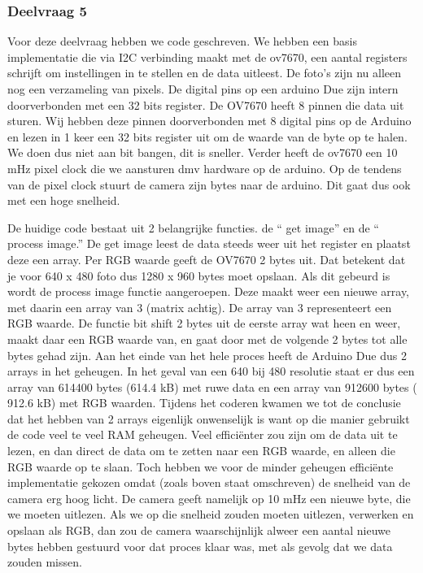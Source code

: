 \documentclass{article}
\begin{document}
\subsubsection{Deelvraag 5}
Voor deze deelvraag hebben we code geschreven. We hebben een basis implementatie die via I2C verbinding maakt met de ov7670, een aantal registers schrijft om instellingen in te stellen en de data uitleest. De foto’s zijn nu alleen nog een verzameling van pixels. De digital pins op een arduino Due zijn intern doorverbonden met een 32 bits register. De OV7670 heeft 8 pinnen die data uit sturen. Wij hebben deze pinnen doorverbonden met 8 digital pins op de Arduino en lezen in 1 keer een 32 bits register uit om de waarde van de byte op te halen. We doen dus niet aan bit bangen, dit is sneller. Verder heeft de ov7670 een 10 mHz pixel clock die we aansturen dmv hardware op de arduino. Op de tendens van de pixel clock stuurt de camera zijn bytes naar de arduino. Dit gaat dus ook met een hoge snelheid.

De huidige code bestaat uit 2 belangrijke functies. de “ get image” en de “ process image.” De get image leest de data steeds weer uit het register en plaatst deze een array. Per RGB waarde geeft de OV7670 2 bytes uit. Dat betekent dat je voor 640 x 480 foto dus 1280 x 960 bytes moet opslaan.
Als dit gebeurd is wordt de process image functie aangeroepen. Deze maakt weer een nieuwe array, met daarin een array van 3 (matrix achtig). De array van 3 representeert een RGB waarde. De functie bit shift 2 bytes uit de eerste array wat heen en weer, maakt daar een RGB waarde van, en gaat door met de volgende 2 bytes tot alle bytes gehad zijn.
Aan het einde van het hele proces heeft de Arduino Due dus 2 arrays in het geheugen. In het geval van een 640 bij 480 resolutie staat er dus een array van 614400 bytes (614.4 kB) met ruwe data en een array van 912600 bytes ( 912.6 kB) met RGB waarden. 
Tijdens het coderen kwamen we tot de conclusie dat het hebben van 2 arrays eigenlijk onwenselijk is want op die manier gebruikt de code veel te veel RAM geheugen. Veel efficiënter zou zijn om de data uit te lezen, en dan direct de data om te zetten naar een RGB waarde, en alleen die RGB waarde op te slaan. Toch hebben we voor de minder geheugen efficiënte implementatie gekozen omdat (zoals boven staat omschreven) de snelheid van de camera erg hoog licht. De camera geeft namelijk op 10 mHz een nieuwe byte, die we moeten uitlezen. Als we op die snelheid zouden moeten uitlezen, verwerken en opslaan als RGB, dan zou de camera waarschijnlijk alweer een aantal nieuwe bytes hebben gestuurd voor dat proces klaar was, met als gevolg dat we data zouden missen. 
\end{document}
